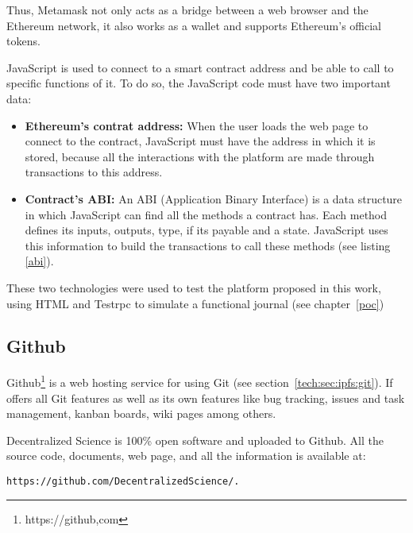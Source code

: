 Thus, Metamask not only acts as a bridge between a web browser and the Ethereum
network, it also works as a wallet and supports Ethereum's official tokens.

JavaScript is used to connect to a smart contract address and be able to call to
specific functions of it. To do so, the JavaScript code must have two important
data:

\begin{itemize}
\item \textbf{Ethereum's contrat address:} When the user loads the web page to
  connect to the contract, JavaScript must have the address in which it is
  stored, because all the interactions with the platform are made through
  transactions to this address.
\item \textbf{Contract's ABI:} An ABI (Application Binary Interface) is a data
  structure in which JavaScript can find all the methods a contract has. Each
  method defines its inputs, outputs, type, if its payable and a state.
  JavaScript uses this information to build the transactions to call these
  methods (see listing \ref{abi}).

\end{itemize}

These two technologies were used to test the platform proposed in this work,
using HTML and Testrpc to simulate a functional journal (see chapter~\ref{poc})





\subsection{Github}
\label{sec:github}

Github\footnote{https://github,com} is a web hosting service for  using
Git (see section~\ref{tech:sec:ipfs:git}). If offers all Git features as well as
its own features like bug tracking, issues and task management, kanban boards,
wiki pages among others.

Decentralized Science is 100\% open software and uploaded to Github. All the
source code, documents, web page, and all the information is available at:

\begin{lstlisting}[frame=single]
  https://github.com/DecentralizedScience/.
\end{lstlisting}
